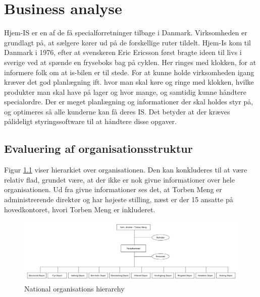 \chapter{Business analyse}\label{ch:businessanalysis}
Hjem-IS er en af de få specialforretninger tilbage i Danmark. Virksomheden er grundlagt på, at sælgere kører ud på de forskellige ruter tildelt. Hjem-Is kom til Danmark i 1976, efter at svenskeren Eric Ericsson først bragte ideen til livs i sverige ved at spænde en fryseboks bag på cyklen. Her ringes med klokken, for at informere folk om at is-bilen er til stede. For at kunne holde virksomheden igang kræver det god planlægning ift. hvor man skal køre og ringe med klokken, hvilke produkter man skal have på lager og hvor mange, og samtidig kunne håndtere specialordre. Der er meget planlægning og informationer der skal holdes styr på, og optimeres så alle kunderne kan få deres IS. Det betyder at der kræves pålideligt styringssoftware til at håndtere disse opgaver. 

\section{Evaluering af organisationsstruktur}
Figur \ref{fig:global_hierarchy} viser hierarkiet over organisationen. Den kan konkluderes til at være relativ flad, grundet være, at der ikke er nok givne informationer over hele organisationen. Ud fra givne informationer ses det, at Torben Meng er administrerende direktør og har højeste stilling, næst er der 15 ansatte på hovedkontoret, hvori Torben Meng er inkluderet.

\begin{landscape}
    \begin{figure}[p]
        \centering
        \includegraphics[width=\hsize]{figures/businesscase/global_hierarchy.png}
        \caption{National organisations hierarchy}
        \label{fig:global_hierarchy}
    \end{figure}        
\end{landscape}


